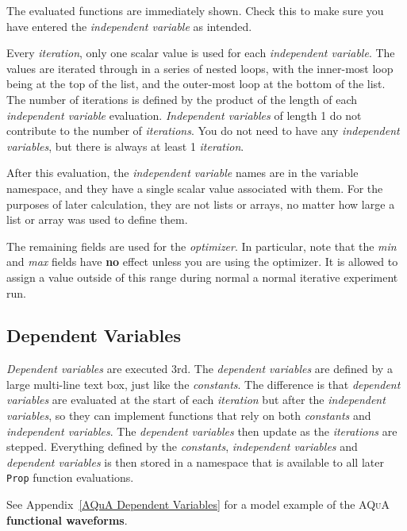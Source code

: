 \documentclass[pdftex,11pt,letterpaper]{article}
\begin{document}
The evaluated functions are immediately shown.  Check this to make sure you have entered the \textit{independent variable} as intended.

Every \textit{iteration}, only one scalar value is used for each \textit{independent variable}.  The values are iterated through in a series of nested loops, with the inner-most loop being at the top of the list, and the outer-most loop at the bottom of the list.  The number of iterations is defined by the product of the length of each \textit{independent variable} evaluation.  \textit{Independent variables} of length 1 do not contribute to the number of \textit{iterations}.  You do not need to have any \textit{independent variables}, but there is always at least 1 \textit{iteration}.

After this evaluation, the \textit{independent variable} names are in the variable namespace, and they have a single scalar value associated with them.  For the purposes of later calculation, they are not lists or arrays, no matter how large a list or array was used to define them.

The remaining fields are used for the \textit{optimizer}.  In particular, note that the \textit{min} and \textit{max} fields have \textbf{no} effect unless you are using the optimizer.  It is allowed to assign a value outside of this range during normal a normal iterative experiment run.

\subsection{Dependent Variables}

\textit{Dependent variables} are executed 3rd.  The \textit{dependent variables} are defined by a large multi-line text box, just like the \textit{constants}.  The difference is that \textit{dependent variables} are evaluated at the start of each \textit{iteration} but after the \textit{independent variables}, so they can implement functions that rely on both \textit{constants} and \textit{independent variables}.  The \textit{dependent variables} then update as the \textit{iterations} are stepped.  Everything defined by the \textit{constants}, \textit{independent variables} and \textit{dependent variables} is then stored in a namespace that is available to all later \texttt{Prop} function evaluations.

See Appendix~\ref{AQuA Dependent Variables} for a model example of the \textsc{AQuA} \textbf{functional waveforms}.
\end{document}
